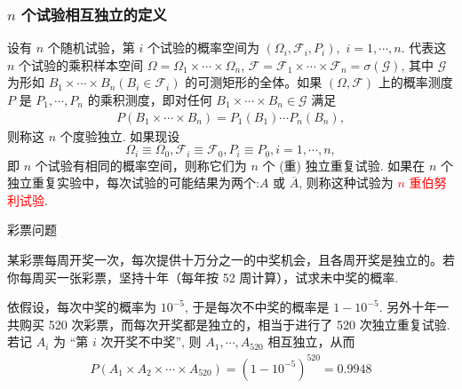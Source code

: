 \documentclass[Prob-All.tex]{subfiles}
\begin{document}
\begin{frame}
  \frametitle{$n$ 个试验相互独立的定义}
  \begin{defi}
    设有 $n$ 个随机试验，第 $i$ 个试验的概率空间为 $(\Omega_i,\mathcal{F}_i,P_i),$ $ i=1,\cdots,n$. 代表这 $n$ 个试验的乘积样本空间 $\Omega=\Omega_1\times \cdots \times \Omega_n$, $\mathcal{F}=\mathcal{F}_1\times \cdots\times \mathcal{F}_n=\sigma (\mathcal{G})$, 其中 $\mathcal{G}$ 为形如 $B_1\times\cdots\times B_n (B_i\in\mathcal{F}_i)$ 的可测矩形的全体。如果 $(\Omega,\mathcal{F})$ 上的概率测度 $P$ 是 $P_1,\cdots, P_n$ 的乘积测度，即对任何 $B_1\times\cdots\times B_n\in \mathcal{G}$ 满足
    \begin{eqnarray*}
      P(B_1\times\cdots\times B_n)=P_1(B_1)\cdots P_n(B_n),
    \end{eqnarray*}
    则称这 $n$ 个度验独立. \pause 如果现设 $$\Omega_i\equiv \Omega_0, \mathcal{F}_i\equiv \mathcal{F}_0, P_i\equiv P_0, i=1,\cdots,n, $$ 即 $n$ 个试验有相同的概率空间，则称它们为 $n$ 个 (重) 独立重复试验. \pause 如果在 $n$ 个独立重复实验中，每次试验的可能结果为两个:$A$ 或 $\overline{A}$, 则称这种试验为 \textcolor{red}{$n$ 重伯努利试验}.
  \end{defi}
\end{frame}
             \begin{frame}{彩票问题}
  \begin{exam}
    某彩票每周开奖一次，每次提供十万分之一的中奖机会，且各周开奖是独立的。若你每周买一张彩票，坚持十年（每年按 52 周计算），试求未中奖的概率.
  \end{exam}
  \pause

  \jieda 依假设，每次中奖的概率为 $10^{-5}$, 于是每次不中奖的概率是 $1-10^{-5}$. 另外十年一共购买 520 次彩票，而每次开奖都是独立的，相当于进行了 520 次独立重复试验. \pause 若记 $A_i$ 为 “第 $i$ 次开奖不中奖”, 则 $A_1,\cdots, A_{520}$ 相互独立，从而
  \begin{eqnarray*}
    P(A_1\times A_2\times\cdots\times A_{520})=(1-10^{-5})^{520}=0.9948
  \end{eqnarray*}
\end{frame}















\end{document}
